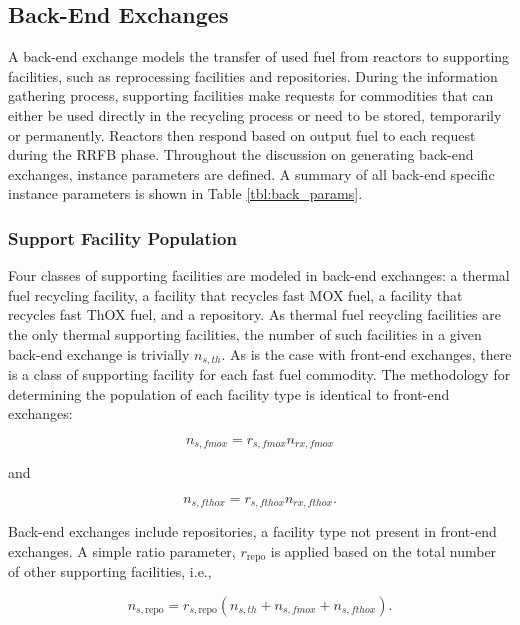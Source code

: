 \subsection{Back-End Exchanges}\label{method:setup:back}

A back-end exchange models the transfer of used fuel from reactors to supporting
facilities, such as reprocessing facilities and repositories. During the
information gathering process, supporting facilities make requests for
commodities that can either be used directly in the recycling process or need to
be stored, temporarily or permanently. Reactors then respond based on output
fuel to each request during the RRFB phase. Throughout the discussion on
generating back-end exchanges, instance parameters are defined. A summary of all
back-end specific instance parameters is shown in Table \ref{tbl:back_params}.

\subsubsection{Support Facility Population}\label{method:setup:back:sup}

Four classes of supporting facilities are modeled in back-end exchanges: a
thermal fuel recycling facility, a facility that recycles fast MOX fuel, a
facility that recycles fast ThOX fuel, and a repository. As thermal fuel
recycling facilities are the only thermal supporting facilities, the number of
such facilities in a given back-end exchange is trivially $n_{s, th}$. As is the
case with front-end exchanges, there is a class of supporting facility for each
fast fuel commodity. The methodology for determining the population of each
facility type is identical to front-end exchanges:

\begin{equation}
n_{s, fmox} = r_{s, fmox} n_{rx, fmox}
\end{equation}

and

\begin{equation}
n_{s, fthox} = r_{s, fthox} n_{rx, fthox}.
\end{equation}

Back-end exchanges include repositories, a facility type not present in
front-end exchanges. A simple ratio parameter, $r_{\text{repo}}$ is applied
based on the total number of other supporting facilities, i.e.,

\begin{equation}
n_{s, \text{repo}} = r_{s, \text{repo}} ( n_{s, th} + n_{s, fmox} +n_{s, fthox} ).
\end{equation}

